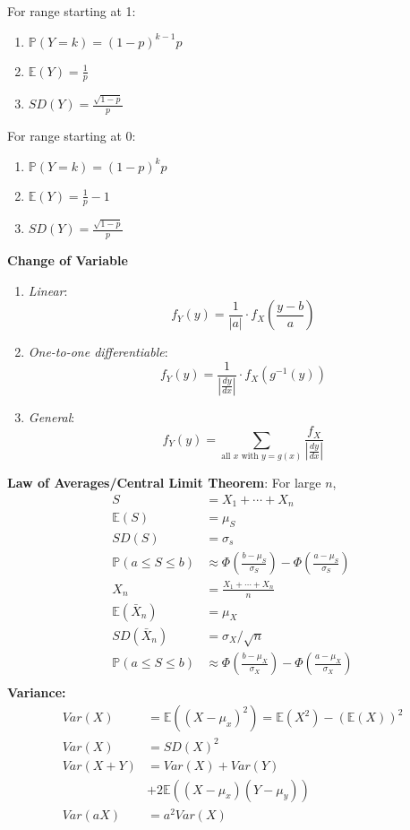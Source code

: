 \documentclass[titlepage, 12pt, leqno]{article}
\begin{document}
\begin{multicols*}{2}
For range starting at 1:
\begin{enumerate}
    \item $\mathbb{P}(Y=k) = (1-p)^{k-1}p$
    \item $ \mathbb{E}(Y) = \frac{1}{p}$
    \item $SD(Y) = \frac{\sqrt{1-p}}{p}$
\end{enumerate}

For range starting at 0:
\begin{enumerate}
    \item $\mathbb{P}(Y=k) = (1-p)^kp$
    \item $ \mathbb{E}(Y) = \frac{1}{p}-1$
    \item $SD(Y) = \frac{\sqrt{1-p}}{p}$
\end{enumerate}

\textbf{Change of Variable}
\begin{enumerate}
    \item \textit{Linear}:
        \[
            f_Y(y) = \frac{1}{|a|} \cdot f_X\left(\frac{y-b}{a}\right)
        \]
    \item \textit{One-to-one differentiable}:
        \[
            f_Y(y) = \frac{1}{\left|\frac{dy}{dx}\right|}\cdot f_X(g^{-1}(y))
        \]
    \item \textit{General}:
        \[
            f_Y(y) = \sum_{ \text{all $x$ with $y = g(x)$}}
            \frac{f_X}{\left|\frac{dy}{dx}\right|}
        \]
\end{enumerate}

\textbf{Law of Averages/Central Limit Theorem}:
For large $n$,
\begin{align*}
    S &= X_1 + \cdots + X_n \\
    \mathbb{E}(S) &= \mu_S \\
    SD(S) &= \sigma_s \\
    \mathbb{P}(a\le S\le b) &\approx \Phi\left(\frac{b-\mu_S}{\sigma_S}\right) -
        \Phi\left(\frac{a-\mu_S}{\sigma_S}\right)\\
    X_n &= \frac{X_1 + \cdots + X_n}{n} \\
    \mathbb{E}(\bar X_n) &= \mu_X \\
    SD(\bar X_n) &= \sigma_X / \sqrt{n}\\
    \mathbb{P}(a\le S\le b) &\approx \Phi\left(\frac{b-\mu_X}{\sigma_X}\right) -
        \Phi\left(\frac{a-\mu_X}{\sigma_X}\right)\\
\end{align*}
\textbf{Variance:}
\begin{align*}
    Var(X) &= \mathbb{E}((X-\mu_x)^2) = \mathbb{E}(X^2) - ( \mathbb{E}(X))^2 \\
    Var(X) &= SD(X)^2\\
    Var(X+Y) &= Var(X) + Var(Y) \\
             & + 2 \mathbb{E}((X-\mu_x)(Y-\mu_y)) \\
            Var(aX) &= a^2Var(X)
\end{align*}
\columnbreak


\end{multicols*}
\end{document}
